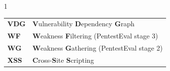 \begin{spacing}{1}
\begin{tabular}{ll}
		\textbf{VDG}     & \textbf{V}ulnerability \textbf{D}ependency \textbf{G}raph                                   \\
		\textbf{WF}      & \textbf{W}eakness \textbf{F}iltering (PentestEval stage 3)                                  \\
		\textbf{WG}      & \textbf{W}eakness \textbf{G}athering (PentestEval stage 2)                                  \\
		\textbf{XSS}     & \textbf{C}ross-\textbf{S}ite \textbf{S}cripting                                             \\
	\end{tabular}
\end{spacing}
\clearpage
